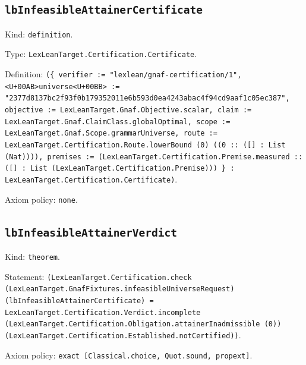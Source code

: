 \documentclass[11pt]{article}
\begin{document}
\subsection*{\texttt{lbInfeasibleAttainerCertificate}}
\noindent Kind: \texttt{definition}.\par
\noindent Type: \texttt{LexLeanTarget.Certification.Certificate}.\par
\noindent Definition: \texttt{(\{ verifier := "lexlean/gnaf-certification/1", <U+00AB>universe<U+00BB> := "2377d8137bc2f93f0b179352011e6b593d0ea4243abac4f94cd9aaf1c05ec387", objective := LexLeanTarget.Gnaf.Objective.scalar, claim := LexLeanTarget.Gnaf.ClaimClass.globalOptimal, scope := LexLeanTarget.Gnaf.Scope.grammarUniverse, route := LexLeanTarget.Certification.Route.lowerBound (0) ((0 :: ([] : List (Nat)))), premises := (LexLeanTarget.Certification.Premise.measured :: ([] : List (LexLeanTarget.Certification.Premise))) \} : LexLeanTarget.Certification.Certificate)}.\par
\noindent Axiom policy: \texttt{none}.\par
\subsection*{\texttt{lbInfeasibleAttainerVerdict}}
\noindent Kind: \texttt{theorem}.\par
\noindent Statement: \texttt{(LexLeanTarget.Certification.check (LexLeanTarget.GnafFixtures.infeasibleUniverseRequest) (lbInfeasibleAttainerCertificate) = LexLeanTarget.Certification.Verdict.incomplete (LexLeanTarget.Certification.Obligation.attainerInadmissible (0)) (LexLeanTarget.Certification.Established.notCertified))}.\par
\noindent Axiom policy: \texttt{exact [Classical.choice, Quot.sound, propext]}.\par
\end{document}
